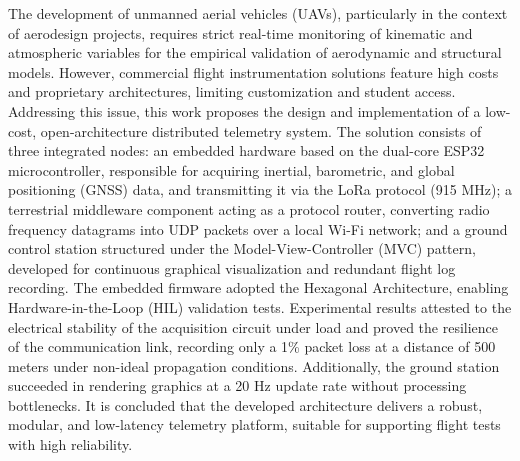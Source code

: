 The development of unmanned aerial vehicles (UAVs), particularly in the context of aerodesign projects, requires strict real-time monitoring of kinematic and atmospheric variables for the empirical validation of aerodynamic and structural models. However, commercial flight instrumentation solutions feature high costs and proprietary architectures, limiting customization and student access. Addressing this issue, this work proposes the design and implementation of a low-cost, open-architecture distributed telemetry system. The solution consists of three integrated nodes: an embedded hardware based on the dual-core ESP32 microcontroller, responsible for acquiring inertial, barometric, and global positioning (GNSS) data, and transmitting it via the LoRa protocol (915 MHz); a terrestrial middleware component acting as a protocol router, converting radio frequency datagrams into UDP packets over a local Wi-Fi network; and a ground control station structured under the Model-View-Controller (MVC) pattern, developed for continuous graphical visualization and redundant flight log recording. The embedded firmware adopted the Hexagonal Architecture, enabling Hardware-in-the-Loop (HIL) validation tests. Experimental results attested to the electrical stability of the acquisition circuit under load and proved the resilience of the communication link, recording only a 1\% packet loss at a distance of 500 meters under non-ideal propagation conditions. Additionally, the ground station succeeded in rendering graphics at a 20 Hz update rate without processing bottlenecks. It is concluded that the developed architecture delivers a robust, modular, and low-latency telemetry platform, suitable for supporting flight tests with high reliability.


